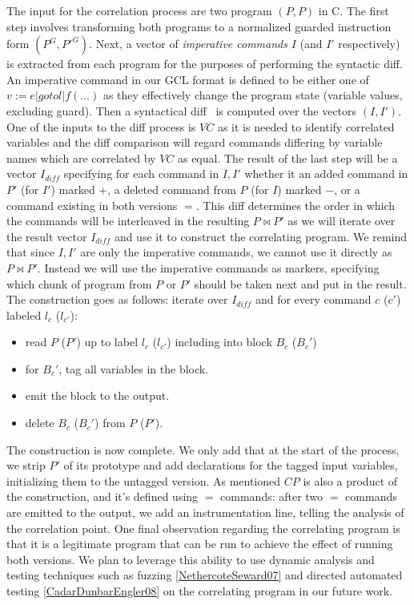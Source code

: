 The input for the correlation process are two program $(P,P)$ in C. The first step involves transforming both programs to a normalized guarded instruction form $(P^{G},P'^{G})$. Next, a vector of \emph{imperative commands} $I$ (and $I'$ respectively) is extracted from each program for the purposes of performing the syntactic diff. An imperative command in our GCL format is defined to be either one of $v := e | goto l | f(...)$ as they effectively change the program state (variable values, excluding guard). Then a syntactical diff~\cite{HuntMcIlroy75} is computed over the vectors $(I,I')$. One of the inputs to the diff process is $VC$ as it is needed to identify correlated variables and the diff comparison will regard commands differing by variable names which are correlated by $VC$ as equal. The result of the last step will be a vector $I_{diff}$ specifying for each command in $I,I'$ whether it an added command in $P'$ (for $I'$) marked $+$, a deleted command from $P$ (for $I$) marked $-$, or a command existing in both versions $=$. This diff determines the order in which the commands will be interleaved in the resulting $P \bowtie P'$ as we will iterate over the result vector $I_{diff}$ and use it to construct the correlating program. We remind that since $I,I'$ are only the imperative commands, we cannot use it directly as $P \bowtie P'$. Instead we will use the imperative commands as markers, specifying which chunk of program from $P$ or $P'$ should be taken next and put in the result. The construction goes as follows: iterate over $I_{diff}$ and for every command $c$ ($c'$) labeled $l_c$ ($l_{c'}$):
\begin{itemize}
\item read $P$ ($P'$) up to label $l_c$ ($l_{c'}$) including into block $B_c$ ($B_c'$)
\item for $B_c'$, tag all variables in the block.
\item emit the block to the output.
\item delete $B_c$ ($B_c'$) from $P$ ($P'$).
\end{itemize}
The construction is now complete. We only add that at the start of the process, we strip $P'$ of its prototype and add declarations for the tagged input variables, initializing them to the untagged version.
As mentioned $CP$ is also a product of the construction, and it's defined using $=$ commands: after two $=$ commands are emitted to the output, we add an instrumentation line, telling the analysis of the correlation point.
One final observation regarding the correlating program is that it is a legitimate program that can be run to achieve the effect of running both versions. We plan to leverage this ability to use dynamic analysis and testing techniques such as fuzzing \ref{NethercoteSeward07} and directed automated testing \ref{CadarDunbarEngler08} on the correlating program in our future work.
